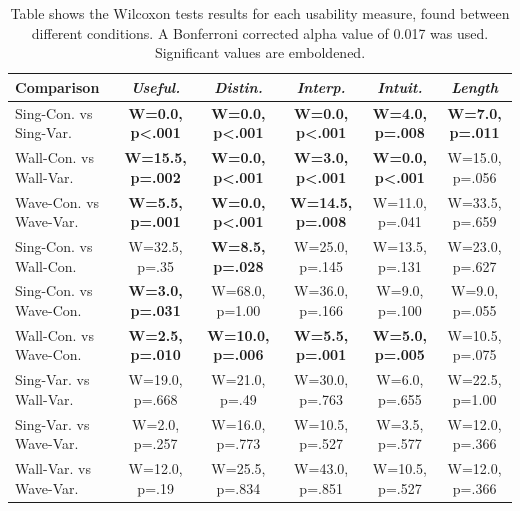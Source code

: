 \documentclass{mpaper}
\begin{document}
\begin{table}[h]
    \centering
    \begin{tabular}{l|ccccc}
        \toprule
        Comparison & \emph{Useful.} & \emph{Distin.} & \emph{Interp.} & \emph{Intuit.} & \emph{Length}\\ \midrule
        Sing-Con. vs Sing-Var. & \textbf{W=0.0, p<.001} & \textbf{W=0.0, p<.001} & \textbf{W=0.0, p<.001} & \textbf{W=4.0, p=.008} & \textbf{W=7.0, p=.011} \\
        Wall-Con. vs Wall-Var. & \textbf{W=15.5, p=.002} & \textbf{W=0.0, p<.001} & \textbf{W=3.0, p<.001} & \textbf{W=0.0, p<.001} & W=15.0, p=.056 \\
        Wave-Con. vs Wave-Var. & \textbf{W=5.5, p=.001} & \textbf{W=0.0, p<.001} & \textbf{W=14.5, p=.008} & W=11.0, p=.041 & W=33.5, p=.659 \\ \midrule
        Sing-Con. vs Wall-Con. & W=32.5, p=.35 & \textbf{W=8.5, p=.028} & W=25.0, p=.145 & W=13.5, p=.131 & W=23.0, p=.627 \\
        Sing-Con. vs Wave-Con. & \textbf{W=3.0, p=.031} & W=68.0, p=1.00 & W=36.0, p=.166 & W=9.0, p=.100 & W=9.0, p=.055 \\
        Wall-Con. vs Wave-Con. & \textbf{W=2.5, p=.010} & \textbf{W=10.0, p=.006} & \textbf{W=5.5, p=.001} & \textbf{W=5.0, p=.005} & W=10.5, p=.075 \\ \midrule
        Sing-Var. vs Wall-Var. & W=19.0, p=.668 & W=21.0, p=.49 & W=30.0, p=.763 & W=6.0, p=.655 & W=22.5, p=1.00 \\
        Sing-Var. vs Wave-Var. & W=2.0, p=.257 & W=16.0, p=.773 & W=10.5, p=.527 & W=3.5, p=.577 & W=12.0, p=.366 \\
        Wall-Var. vs Wave-Var. & W=12.0, p=.19 & W=25.5, p=.834 & W=43.0, p=.851 & W=10.5, p=.527 & W=12.0, p=.366 \\
        \bottomrule
    \end{tabular}
    \caption{Table shows the Wilcoxon tests results for each usability measure, found between different conditions. A Bonferroni corrected alpha value of 0.017 was used. Significant values are emboldened.}
    \label{tab:usability-stats}
\end{table}
\end{document}
